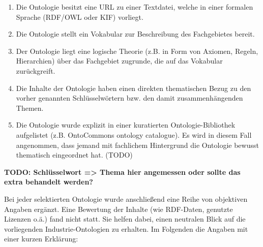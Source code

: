 \documentclass{article}
\begin{document}
\begin{enumerate}
    \item Die Ontologie besitzt eine URL zu einer Textdatei, welche in einer formalen Sprache (RDF/OWL oder KIF) vorliegt.
    \item Die Ontologie stellt ein Vokabular zur Beschreibung des Fachgebietes bereit.
    \item Der Ontologie liegt eine logische Theorie (z.B. in Form von Axiomen, Regeln, Hierarchien) über das Fachgebiet zugrunde, die auf das Vokabular zurückgreift.
    \item Die Inhalte der Ontologie haben einen direkten thematischen Bezug zu den vorher genannten Schlüsselwörtern bzw. den damit zusammenhängenden Themen.
    \item Die Ontologie wurde explizit in einer kuratierten Ontologie-Bibliothek aufgelistet (z.B. OntoCommons ontology catalogue). Es wird in diesem Fall angenommen, dass jemand mit fachlichem Hintergrund die Ontologie bewusst thematisch eingeordnet hat. (TODO)
\end{enumerate}

\textbf{TODO: Schlüsselwort => Thema hier angemessen oder sollte das extra behandelt werden?}

Bei jeder selektierten Ontologie wurde anschließend eine Reihe von objektiven Angaben ergänzt.
Eine Bewertung der Inhalte (wie RDF-Daten, genutzte Lizenzen o.ä.) fand nicht statt.
Sie helfen dabei, einen neutralen Blick auf die vorliegenden Industrie-Ontologien zu erhalten.
Im Folgenden die Angaben mit einer kurzen Erklärung:
\end{document}
